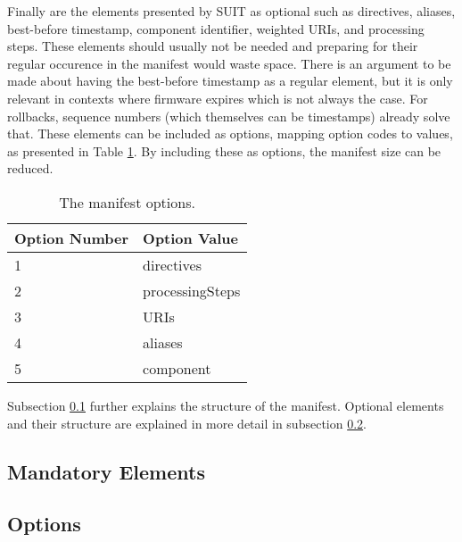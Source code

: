 \documentclass[0-thesis.tex]{subfiles}
\begin{document}
Finally are the elements presented by SUIT as optional such as directives, aliases,
best-before timestamp, component identifier, weighted URIs, and processing steps. These
elements should usually not be needed and preparing for their regular occurence in the
manifest would waste space. There is an argument to be made about having the best-before
timestamp as a regular element, but it is only relevant in contexts where firmware expires
which is not always the case. For rollbacks, sequence numbers (which themselves can be
timestamps) already solve that. These elements can be included as options, mapping option
codes to values, as presented in Table \ref{tab:option-codes}. By including these as
options, the manifest size can be reduced.

\begin{longtable}[]{@{}ll@{}}
    \caption{The manifest options.}
    \label{tab:option-codes}\\
    \toprule
    Option Number & Option Value\tabularnewline
    \midrule
    \endhead
    1 & directives\tabularnewline
    2 & processingSteps\tabularnewline
    3 & URIs\tabularnewline
    4 & aliases\tabularnewline
    5 & component\tabularnewline
    \bottomrule
\end{longtable}
    

Subsection \ref{ssec:mandatory-elements} further explains the structure of the manifest.
Optional elements and their structure are explained in more detail in subsection
\ref{ssec:options}.

\subsection{Mandatory Elements}
\label{ssec:mandatory-elements}

\subsection{Options}
\label{ssec:options}
\end{document}
